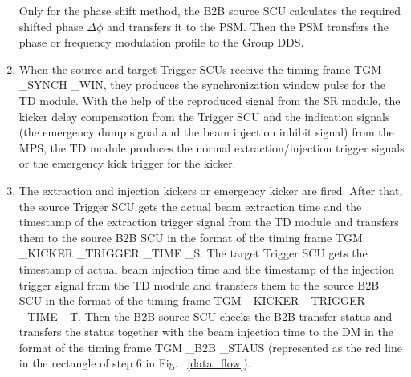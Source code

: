 \begin{enumerate}
Only for the phase shift method, the B2B source SCU calculates the required shifted phase $\Delta \phi$ and transfers it to the PSM. Then the PSM transfers the phase or frequency modulation profile to the Group DDS.  

\item  When the source and target Trigger SCUs receive the timing frame TGM \_SYNCH \_WIN, they produces the synchronization window pulse for the TD module. With the help of the reproduced signal from the SR module, the kicker delay compensation from the Trigger SCU and the indication signals (the emergency dump signal and the beam injection inhibit signal) from the MPS, the TD module produces the normal extraction/injection trigger signals or the emergency kick trigger for the kicker.  

\item  The extraction and injection kickers or emergency kicker are fired. After that, the source Trigger SCU gets the actual beam extraction time and the timestamp of the extraction trigger signal from the TD module and transfers them to the source B2B SCU in the format of the timing frame TGM \_KICKER \_TRIGGER \_TIME \_S. The target Trigger SCU gets the timestamp of actual beam injection time and the timestamp of the injection trigger signal from the TD module and transfers them to the source B2B SCU in the format of the timing frame TGM \_KICKER \_TRIGGER \_TIME \_T. Then the B2B source SCU checks the B2B transfer status and transfers the status together with the beam injection time to the DM in the format of the timing frame TGM \_B2B \_STAUS (represented as the red line in the rectangle of step 6 in Fig. ~\ref{data_flow}).

\end{enumerate}


